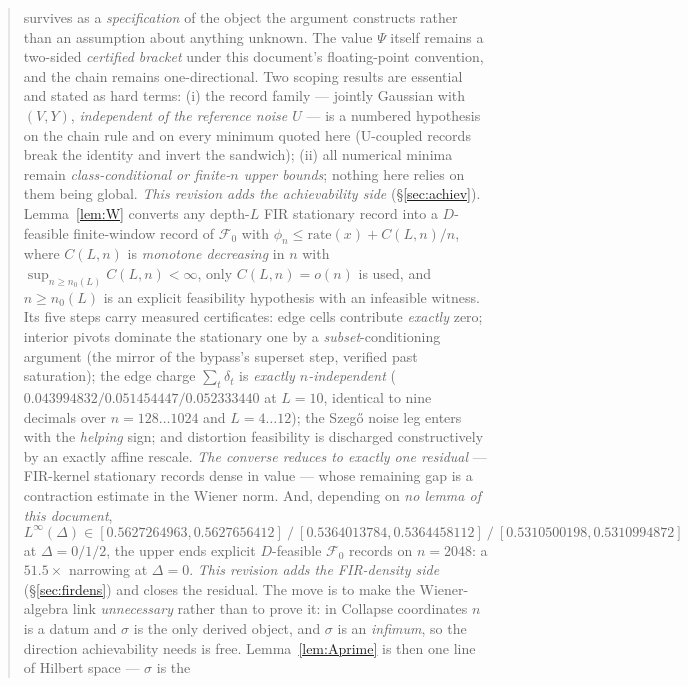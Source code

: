 \documentclass[11pt]{article}
\theoremstyle{definition}
\theoremstyle{remark}
\begin{document}
\begin{abstract}
survives as a \emph{specification} of the object the argument
constructs rather than an assumption about anything unknown. The value
$\Psi$ itself remains a two-sided \emph{certified bracket} under this
document's floating-point convention, and the chain remains
one-directional. Two scoping results are essential and
stated as hard terms: (i) the record family --- jointly Gaussian
with $(V,Y)$, \emph{independent of the reference noise $U$} --- is a
numbered hypothesis on the chain rule and on every minimum quoted
here (U-coupled records break the identity and invert the sandwich);
(ii) all numerical minima remain \emph{class-conditional or
finite-$n$ upper bounds}; nothing here relies on them being global.
\emph{This revision adds the achievability side} (\S\ref{sec:achiev}).
Lemma~\ref{lem:W} converts any depth-$L$ FIR stationary record into a
$D$-feasible finite-window record of $\mathcal F_0$ with
$\phi_n\le\mathrm{rate}(x)+C(L,n)/n$, where $C(L,n)$ is \emph{monotone
decreasing} in $n$ with $\sup_{n\ge n_0(L)}C(L,n)<\infty$, only
$C(L,n)=o(n)$ is used, and $n\ge n_0(L)$ is an explicit feasibility
hypothesis with an infeasible witness. Its five steps carry measured
certificates: edge cells contribute \emph{exactly} zero; interior pivots
dominate the stationary one by a \emph{subset}-conditioning argument
(the mirror of the bypass's superset step, verified past saturation);
the edge charge $\sum_t\delta_t$ is \emph{exactly $n$-independent}
($0.043994832/0.051454447/0.052333440$ at $L=10$, identical to nine
decimals over $n=128\ldots1024$ and $L=4\ldots12$); the Szeg\H o noise
leg enters with the \emph{helping} sign; and distortion feasibility is
discharged constructively by an exactly affine rescale. \emph{The
converse reduces to exactly one residual} --- FIR-kernel stationary
records dense in value --- whose remaining gap is a contraction estimate
in the Wiener norm. And, depending on \emph{no lemma of this document},
\[
L^\infty(\Delta)\in[0.5627264963,0.5627656412]\ /\
[0.5364013784,0.5364458112]\ /\ [0.5310500198,0.5310994872]
\]
at $\Delta=0/1/2$, the upper ends explicit $D$-feasible $\mathcal F_0$
records on $n=2048$: a $51.5\times$ narrowing at $\Delta=0$.
\emph{This revision adds the FIR-density side} (\S\ref{sec:firdens}) and
closes the residual. The move is to make the Wiener-algebra link
\emph{unnecessary} rather than to prove it: in Collapse coordinates $n$ is a
datum and $\sigma$ is the only derived object, and $\sigma$ is an
\emph{infimum}, so the direction achievability needs is free.
Lemma~\ref{lem:Aprime} is then one line of Hilbert space --- $\sigma$ is the

\end{abstract}
\end{document}
